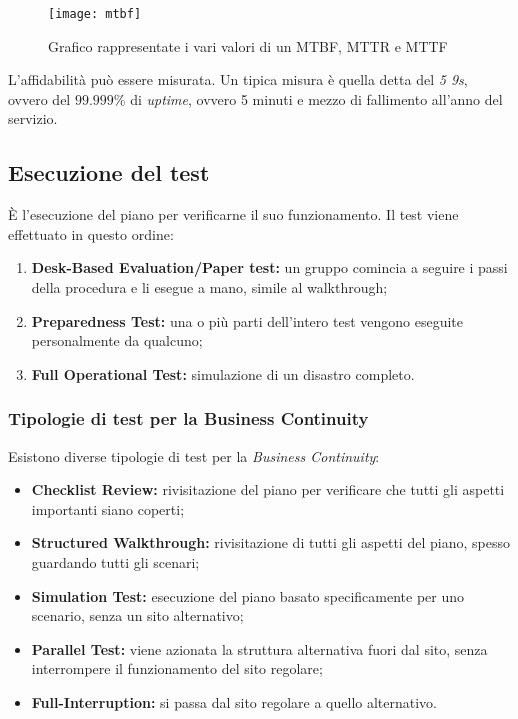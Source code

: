 \begin{figure}[H]
 \centering
 \texttt{[image: mtbf]}
 \caption{Grafico rappresentate i vari valori di un MTBF, MTTR e MTTF}
\end{figure}


L'affidabilità può essere misurata. Un tipica misura è quella detta del
\textit{5 9s}, ovvero del $99.999\%$ di \textit{uptime}, ovvero 5 minuti e
mezzo di fallimento all'anno del servizio.

\subsection{Esecuzione del test}

È l'esecuzione del piano per verificarne il suo funzionamento.
Il test viene effettuato in questo ordine:
\begin{enumerate}
  \item \textbf{Desk-Based Evaluation/Paper test:} un gruppo comincia a 
  seguire i passi della procedura e li esegue a mano, simile al walkthrough;
  \item \textbf{Preparedness Test:} una o più parti dell'intero test vengono
  eseguite personalmente da qualcuno;
  \item \textbf{Full Operational Test:} simulazione di un disastro completo.
\end{enumerate}

\subsubsection{Tipologie di test per la Business Continuity}

Esistono diverse tipologie di test per la \textit{Business Continuity}:
\begin{itemize}
  \item \textbf{Checklist Review:} rivisitazione del piano per verificare
  che tutti gli aspetti importanti siano coperti;
  \item \textbf{Structured Walkthrough:} rivisitazione di tutti gli aspetti
  del piano, spesso guardando tutti gli
  scenari;
  \item \textbf{Simulation Test:} esecuzione del piano basato specificamente 
  per uno scenario, senza un sito alternativo;
  \item \textbf{Parallel Test:} viene azionata la struttura alternativa fuori
  dal sito, senza interrompere il funzionamento del sito regolare;
  \item \textbf{Full-Interruption:} si passa dal sito regolare a quello
  alternativo.
\end{itemize}

